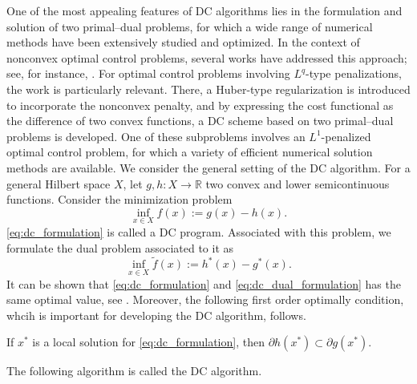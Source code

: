 One of the most appealing features of DC algorithms lies in the formulation and solution of two primal–dual problems, for which a wide range of numerical methods have been extensively studied and optimized. In the context of nonconvex optimal control problems, several works have addressed this approach; see, for instance, \cite{hinze, ioffe}. For optimal control problems involving $L^q$-type penalizations, the work \cite{merino2019} is particularly relevant. There, a Huber-type regularization is introduced to incorporate the nonconvex penalty, and by expressing the cost functional as the difference of two convex functions, a DC scheme based on two primal–dual problems is developed. One of these subproblems involves an $L^1$-penalized optimal control problem, for which a variety of efficient numerical solution methods are available.
We consider the general setting of the DC algorithm. For a general Hilbert space $X$, let $g, h: X\to \mathbb{R}$ two convex and lower semicontinuous functions. Consider the minimization problem
\begin{equation}\label{eq:dc_formulation}
    \inf_{x\in X} f(x):=g(x)-h(x).
\end{equation}
\eqref{eq:dc_formulation} is called a DC program. Associated with this problem, we formulate the dual problem associated to it as
\begin{equation}\label{eq:dc_dual_formulation}
    \inf_{x\in X} \widetilde{f}(x):=h^{*}(x)-g^{*}(x).
\end{equation}
It can be shown that \eqref{eq:dc_formulation} and \eqref{eq:dc_dual_formulation} has the same optimal value, see \cite[Proposition 2.5]{lim}. Moreover, the following first order optimally condition, whcih is important for developing the DC algorithm, follows.
\begin{proposition}\label{prop:first_order_condition_dc}
    If $x^*$ is a local solution for \eqref{eq:dc_formulation}, then $\partial h(x^*)\subset \partial g(x^*)$.
\end{proposition}

The following algorithm is called the DC algorithm. 

